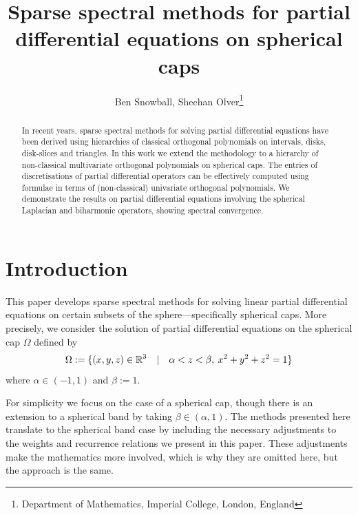 \documentclass[11pt, oneside]{article}   	%
\title{Sparse spectral methods for partial differential equations on spherical caps}
\author{Ben Snowball, Sheehan Olver\thanks{Department of Mathematics, Imperial College, London, England}}
\begin{document}
\maketitle

\begin{abstract}
In recent years, sparse spectral methods for solving partial differential equations have been derived using hierarchies of classical orthogonal polynomials on intervals, disks, disk-slices and triangles. In this work we extend the methodology to a hierarchy of non-classical multivariate orthogonal polynomials on spherical caps. The entries of discretisations of partial differential operators can be effectively computed using formulae in terms of (non-classical) univariate orthogonal polynomials. We demonstrate the results on partial differential equations involving the spherical Laplacian and biharmonic operators, showing spectral convergence. 
\end{abstract}


%
\section{Introduction}

This paper develops sparse spectral methods for solving linear partial differential equations on certain subsets of the sphere---specifically spherical caps. More precisely, we consider the solution of partial differential equations on the spherical cap $\Omega$ defined by
\begin{align*}
	\Omega := \{(x,y,z) \in \mathbb{R}^3 \quad | \quad \alpha < z < \beta, \: x^2 + y^2 + z^2 = 1\}
\end{align*}
where $\alpha \in (-1,1)$ and $\beta := 1$.

\begin{remark}
For simplicity we focus on the case of a spherical cap, though there is an extension to a spherical band by taking $\beta \in (\alpha,1)$. The methods presented here translate to the spherical band case by including the necessary adjustments to the weights and recurrence relations we present in this paper. These adjustments make the mathematics more involved, which is why they are omitted here, but the approach is the same.
\end{remark}
\end{document}
